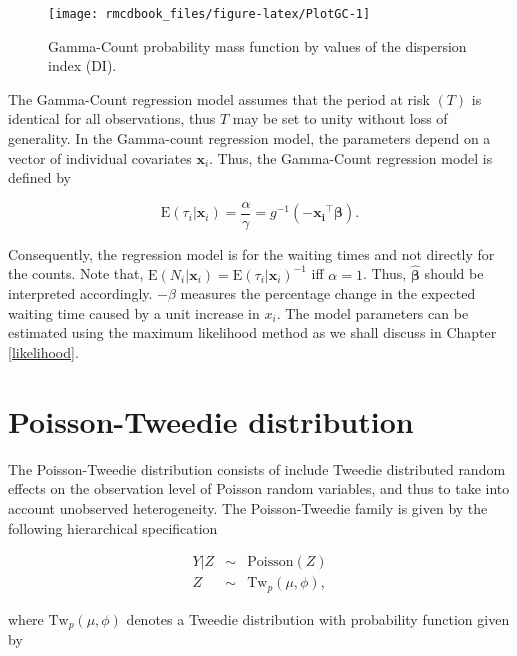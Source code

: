 \documentclass[9pt,a5paper,]{book}
\theoremstyle{definition}
\theoremstyle{definition}
\theoremstyle{remark}
\begin{document}
\begin{figure}[h]

{\centering \texttt{[image: rmcdbook\_files/figure-latex/PlotGC-1]} 

}

\caption{Gamma-Count probability mass function by values of the dispersion index (DI).}\label{fig:PlotGC}
\end{figure}

The Gamma-Count regression model assumes that the period at risk \((T)\)
is identical for all observations, thus \(T\) may be set to unity
without loss of generality. In the Gamma-count regression model, the
parameters depend on a vector of individual covariates
\(\boldsymbol{x}_i\). Thus, the Gamma-Count regression model is defined
by

\begin{equation}
\mathrm{E}(\tau_i | \boldsymbol{x}_i) = \frac{\alpha}{\gamma} = g^{-1}(-\boldsymbol{x_i}^\top \boldsymbol{\beta}).
\end{equation}

Consequently, the regression model is for the waiting times and not
directly for the counts. Note that,
\(\mathrm{E}(N_i | \boldsymbol{x}_i) = \mathrm{E}(\tau_i | \boldsymbol{x}_i)^{-1}\)
iff \(\alpha = 1\). Thus, \(\hat{\boldsymbol{\beta}}\) should be
interpreted accordingly. \(-\beta\) measures the percentage change in
the expected waiting time caused by a unit increase in \(x_i\). The
model parameters can be estimated using the maximum likelihood method as
we shall discuss in Chapter \ref{likelihood}.

\section{Poisson-Tweedie distribution}\label{ptw}

The Poisson-Tweedie distribution
\citep{Bonat2016b, Jorgensen2014, Shaarawi2011} consists of include
Tweedie distributed random effects on the observation level of Poisson
random variables, and thus to take into account unobserved
heterogeneity. The Poisson-Tweedie family is given by the following
hierarchical specification

\begin{eqnarray}
Y|Z &\sim& \mathrm{Poisson}(Z) \\
Z &\sim& \mathrm{Tw}_p(\mu, \phi), \nonumber
\label{eq:conditional}
\end{eqnarray}

where \(\mathrm{Tw}_p(\mu, \phi)\) denotes a Tweedie distribution
\citetext{\citealp[ ]{Jorgensen1987}; \citealp{Jorgensen1997}} with
probability function given by
\end{document}
